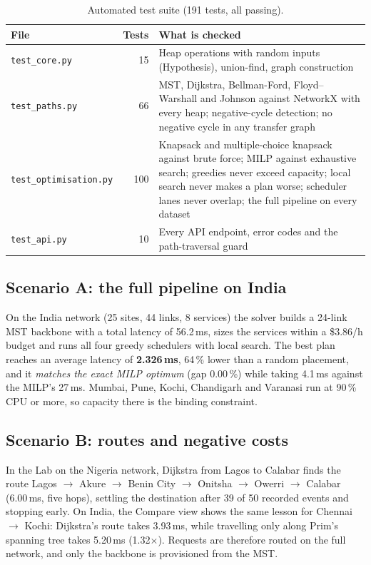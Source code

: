 \begin{table}[!htbp]
\centering\small
\caption{Automated test suite (191 tests, all passing).}\label{tab:tests}
\begin{tabularx}{\textwidth}{@{}l r X@{}}
\toprule
File & Tests & What is checked \\
\midrule
\texttt{test\_core.py} & 15 & Heap operations with random inputs (Hypothesis), union-find, graph construction \\
\texttt{test\_paths.py} & 66 & MST, Dijkstra, Bellman-Ford, Floyd--Warshall and Johnson against NetworkX with every heap; negative-cycle detection; no negative cycle in any transfer graph \\
\texttt{test\_optimisation.py} & 100 & Knapsack and multiple-choice knapsack against brute force; MILP against exhaustive search; greedies never exceed capacity; local search never makes a plan worse; scheduler lanes never overlap; the full pipeline on every dataset \\
\texttt{test\_api.py} & 10 & Every API endpoint, error codes and the path-traversal guard \\
\bottomrule
\end{tabularx}
\end{table}

\subsection{Scenario A: the full pipeline on India}
On the India network (25 sites, 44 links, 8 services) the solver builds a 24-link MST backbone with a total latency of 56.2\,ms, sizes the services within a \$3.86/h budget and runs all four greedy schedulers with local search. The best plan reaches an average latency of \textbf{2.326\,ms}, 64\,\% lower than a random placement, and it \emph{matches the exact MILP optimum} (gap 0.00\,\%) while taking 4.1\,ms against the MILP's 27\,ms. Mumbai, Pune, Kochi, Chandigarh and Varanasi run at 90\,\% CPU or more, so capacity there is the binding constraint.

\subsection{Scenario B: routes and negative costs}
In the Lab on the Nigeria network, Dijkstra from Lagos to Calabar finds the route Lagos $\to$ Akure $\to$ Benin City $\to$ Onitsha $\to$ Owerri $\to$ Calabar (6.00\,ms, five hops), settling the destination after 39 of 50 recorded events and stopping early. On India, the Compare view shows the same lesson for Chennai $\to$ Kochi: Dijkstra's route takes 3.93\,ms, while travelling only along Prim's spanning tree takes 5.20\,ms (1.32$\times$). Requests are therefore routed on the full network, and only the backbone is provisioned from the MST.


